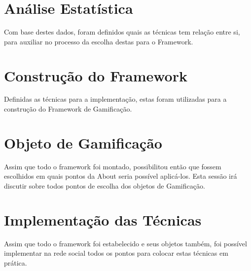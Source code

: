 \section{Análise Estatística}
\label{sec:gamifição}
Com base destes dados, foram definidos quais as técnicas tem relação entre si, para auxiliar no processo
da escolha destas para o Framework.

\section{Construção do Framework}
\label{sec:gamifição}
Definidas as técnicas para a implementação, estas foram utilizadas para a construção do Framework
de Gamificação.

\section{Objeto de Gamificação}
\label{sec:gamifição}
Assim que todo o framework foi montado, possibilitou então que fossem escolhidos em quais
pontos da About seria possível aplicá-los. Esta sessão irá discutir sobre todos pontos de escolha
dos objetos de Gamificação.

\section{Implementação das Técnicas}
\label{sec:gamifição}
Assim que todo o framework foi estabelecido e seus objetos também, foi possível implementar
na rede social todos os pontos para colocar estas técnicas em prática.

